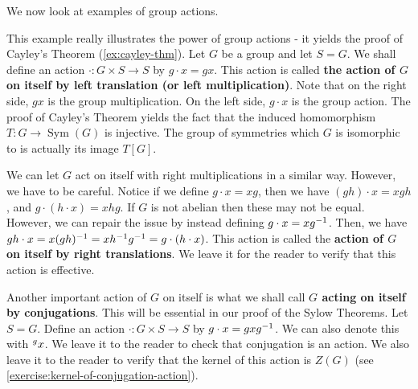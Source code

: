 \documentclass[./main.tex]{subfiles}
\begin{document}
We now look at examples of group actions. 

\begin{example}
\label{example:action-left-translations}
    This example really illustrates the power of group actions - it yields the
    proof of Cayley's Theorem (\cref{ex:cayley-thm}). Let $G$ be a group and let
    $S = G$. We shall define an action $\cdot: G \times S \to S$ by $g \cdot x =
    gx$. This action is called \textbf{the action of $G$ on itself by left
    translation (or left multiplication)}. Note that on the right side, $gx$ is
    the group multiplication. On the left side, $g \cdot x$ is the group action.
    The proof of Cayley's Theorem yields the fact that the induced homomorphism
    $T: G \to \operatorname{Sym}(G)$ is injective. The group of symmetries which
    $G$ is isomorphic to is actually its image $T[G]$.
\end{example}

\begin{example}
\label{example:action-right-translations}
    We can let $G$ act on itself with right multiplications in a similar way.
    However, we have to be careful. Notice if we define $g \cdot x = xg$, then
    we have $(gh) \cdot x = xgh$, and $g \cdot (h \cdot x) = xhg$. If $G$ is not
    abelian then these may not be equal. However, we can repair the issue by
    instead defining $g \cdot x = x g^{-1}$. Then, we have $gh \cdot x =
    x(gh)^{-1} = x h^{-1} g^{-1} = g \cdot (h \cdot x)$. This action is called the
    \textbf{action of $G$ on itself by right translations}. We leave it for the
    reader to verify that this action is effective.
\end{example}

\begin{example}
\label{example:action-conjugations}
    Another important action of $G$ on itself is what we shall call \textbf{$G$
    acting on itself by conjugations}. This will be essential in our proof of
    the Sylow Theorems. Let $S = G$. Define an action $\cdot: G \times S \to S$
    by $g \cdot x = gxg^{-1}$. We can also denote this with $\prescript{g}{}{x}$.
    We leave it to the reader to check that conjugation is an action. We also
    leave it to the reader to verify that the kernel of this action is $Z(G)$
    (see \cref{exercise:kernel-of-conjugation-action}).
    
\end{example}
\end{document}
